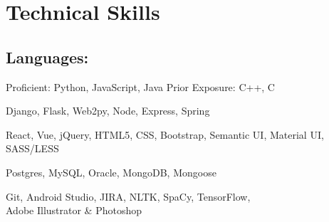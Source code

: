 \documentclass[]{hieudo-build}
\begin{document}
\hfill
\begin{minipage}[t]{0.3\textwidth} 

\section{Technical Skills}
\begin{flushleft}
\narrower
\subsection{Languages:}
\normalsize
  Proficient: Python, JavaScript, Java
  \smallskip
  Prior Exposure: C++, C
\sectionsep

\normalsize
  Django, Flask, Web2py, Node, Express, Spring
\sectionsep

\normalsize
  React, Vue,
  jQuery, HTML5, CSS, Bootstrap, Semantic UI, Material UI,
  SASS/LESS
\sectionsep

\normalsize
  Postgres, MySQL, Oracle, MongoDB, Mongoose
\sectionsep

\normalsize
  Git, Android Studio, JIRA, NLTK, SpaCy, TensorFlow, 
  \\
  Adobe Illustrator \& Photoshop
\end{flushleft}





\end{minipage}
\end{document}
